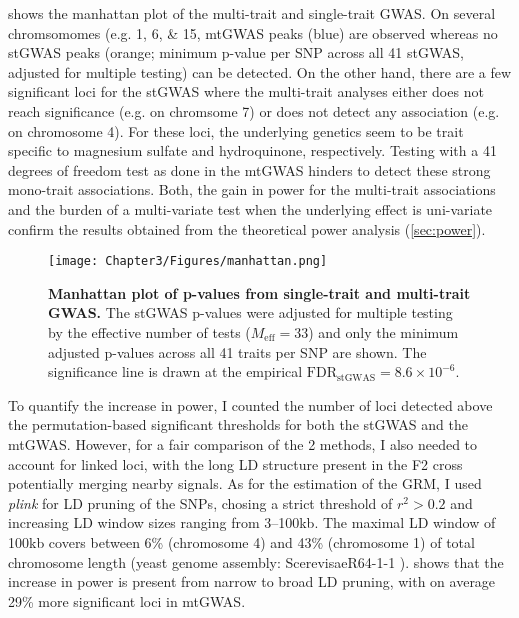  shows the manhattan plot of the multi-trait and single-trait GWAS. On several chromsomomes (e.g. \numlist{1;6;15}, mtGWAS peaks (blue) are observed whereas no stGWAS peaks (orange; minimum p-value per SNP across all \num{41} stGWAS, adjusted for multiple testing) can be detected. On the other hand, there are a few significant loci for the stGWAS where the multi-trait analyses either does not reach significance (e.g. on chromsome \num{7}) or does not detect any association (e.g. on chromosome \num{4}). For these loci, the underlying genetics seem to be trait specific to magnesium sulfate and hydroquinone, respectively. Testing with a \num{41} degrees of freedom test as done in the mtGWAS hinders to detect these strong mono-trait associations. Both, the gain in power for the multi-trait associations and the burden of a multi-variate test when the underlying effect is uni-variate confirm the results obtained from the theoretical power analysis (\cref{sec:power}). 

\begin{figure}[hbtp]
	\centering
	\texttt{[image: Chapter3/Figures/manhattan.png]}
	\caption[\textbf{Manhattan plot of p-values from single-trait and multi-trait GWAS.}]{\textbf{Manhattan plot of p-values from single-trait and multi-trait GWAS.} The stGWAS p-values were adjusted for multiple testing by the effective number of tests (\(M_\text{eff} = 33\)) and only the minimum adjusted p-values across all \num{41} traits per SNP are shown. The significance line is drawn at the empirical \(\text{FDR}_{\text{stGWAS}} =8.6 \times 10^{-6}\).}
 	\label{fig:GWAS-yeast}
\end{figure}

To quantify the increase in power, I counted the number of loci detected above the permutation-based significant thresholds for both the stGWAS and the mtGWAS. However, for a fair comparison of the \num{2} methods, I also needed to account for linked loci, with the long LD structure present in the F2 cross potentially merging nearby signals. As for the estimation of the GRM, I used \textit{plink} for LD pruning of the SNPs, chosing a strict threshold of \(r^2 > 0.2\) and increasing LD window sizes ranging from \numrange{3}{100}kb.  The maximal LD window of \num{100}kb covers between \num{6}\% (chromosome \num{4}) and \num{43}\% (chromosome 1) of total chromosome length (yeast genome assembly: ScerevisaeR64-1-1 \red{\citep{}}).  shows that the increase in power is present from narrow to broad LD pruning, with on average \num{29}\% more significant loci in mtGWAS.

